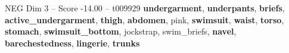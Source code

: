 \begin{textsample}{NEG Dim 3 – Score -14.00 – t009929}  \label{ex:f3_neg_026}
\textbf{undergarment}, \textbf{underpants}, \textbf{briefs}, \textbf{active\_undergarment}, \textbf{thigh}, \textbf{abdomen}, pink, \textbf{swimsuit}, \textbf{waist}, \textbf{torso}, \textbf{stomach}, \textbf{swimsuit\_bottom}, jockstrap, swim\_briefs, \textbf{navel}, \textbf{barechestedness}, \textbf{lingerie}, \textbf{trunks}

\end{textsample}
